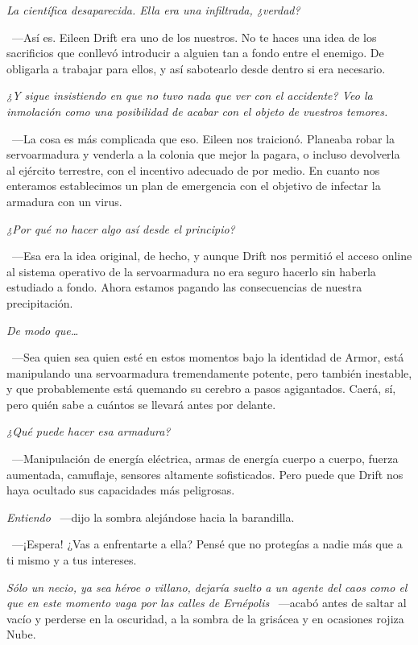 \emph{La científica desaparecida. Ella era una infiltrada, ¿verdad?}

~---Así es. Eileen Drift era uno de los nuestros. No te haces una idea de los sacrificios que conllevó introducir a alguien tan a fondo entre el enemigo. De obligarla a trabajar para ellos, y así sabotearlo desde dentro si era necesario.

\emph{¿Y sigue insistiendo en que no tuvo nada que ver con el accidente? Veo la inmolación como una posibilidad de acabar con el objeto de vuestros temores.}

~---La cosa es más complicada que eso. Eileen nos traicionó. Planeaba robar la servoarmadura y venderla a la colonia que mejor la pagara, o incluso devolverla al ejército terrestre, con el incentivo adecuado de por medio. En cuanto nos enteramos establecimos un plan de emergencia con el objetivo de infectar la armadura con un virus.

\emph{¿Por qué no hacer algo así desde el principio?}

~---Esa era la idea original, de hecho, y aunque Drift nos permitió el acceso online al sistema operativo de la servoarmadura no era seguro hacerlo sin haberla estudiado a fondo. Ahora estamos pagando las consecuencias de nuestra precipitación.

\emph{De modo que\dots}

~---Sea quien sea quien esté en estos momentos bajo la identidad de Armor, está manipulando una servoarmadura tremendamente potente, pero también inestable, y que probablemente está quemando su cerebro a pasos agigantados. Caerá, sí, pero quién sabe a cuántos se llevará antes por delante.

\emph{¿Qué puede hacer esa armadura?}

~---Manipulación de energía eléctrica, armas de energía cuerpo a cuerpo, fuerza aumentada, camuflaje, sensores altamente sofisticados. Pero puede que Drift nos haya ocultado sus capacidades más peligrosas.

\emph{Entiendo} ~---dijo la sombra alejándose hacia la barandilla.

~---¡Espera! ¿Vas a enfrentarte a ella? Pensé que no protegías a nadie más que a ti mismo y a tus intereses.

\emph{Sólo un necio, ya sea héroe o villano, dejaría suelto a un agente del caos como el que en este momento vaga por las calles de Ernépolis} ~---acabó antes de saltar al vacío y perderse en la oscuridad, a la sombra de la grisácea y en ocasiones rojiza Nube.

